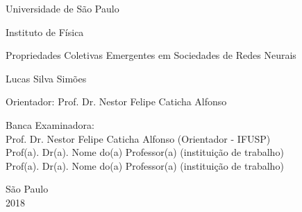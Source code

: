 \clearpage





\pagestyle{empty}

\begin{center}
{\fontsize{16}{16} \selectfont Universidade de São Paulo \\}

\vspace{0.1cm}

{\fontsize{16}{16} \selectfont Instituto de Física}

\vspace{3.3cm}

{\fontsize{22}{22}\selectfont Propriedades Coletivas Emergentes em Sociedades de Redes Neurais \par}

\vspace{2cm}

{\fontsize{18}{18}\selectfont Lucas Silva Simões \par}

\vspace{2cm}

\end{center}

\leftskip 4cm

\begin{flushright}
\leftskip 4cm
Orientador: Prof. Dr.  Nestor Felipe Caticha Alfonso
\end{flushright}

\vspace{0.8cm}

\par
\leftskip 4cm

\par

\leftskip 0cm

\vskip 1.2cm

\noindent Banca Examinadora: \\
\noindent Prof. Dr. Nestor Felipe Caticha Alfonso (Orientador - IFUSP) \\
Prof(a). Dr(a). Nome do(a) Professor(a) (instituição de trabalho) \\
Prof(a). Dr(a). Nome do(a) Professor(a) (instituição de trabalho) \\
\vspace{1.2cm}

\begin{center}
	São Paulo \\ 2018
\end{center}

\clearpage
